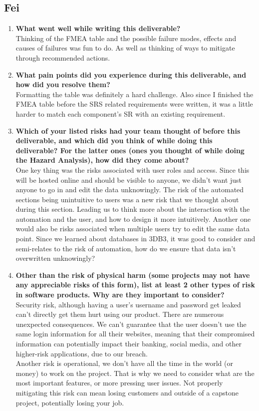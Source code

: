 \documentclass{article}
\begin{document}
\subsection*{Fei}
\begin{enumerate}
    \item \textbf{What went well while writing this deliverable?}\\
    Thinking of the FMEA table and the possible failure modes, effects and causes of failures was fun to do. As well as thinking of ways to mitigate through recommended actions.
    \item \textbf{What pain points did you experience during this deliverable, and how
    did you resolve them?}\\
    Formatting the table was definitely a hard challenge. Also since I finished the FMEA table before the SRS related requirements were written, it was a little harder to match each component's SR with an existing requirement.
    \item \textbf{Which of your listed risks had your team thought of before this
    deliverable, and which did you think of while doing this deliverable? For
    the latter ones (ones you thought of while doing the Hazard Analysis), how
    did they come about?}\\
    One key thing was the risks associated with user roles and access. Since this will be hosted online and should be visible to anyone, we didn't want just anyone to go in and edit the data unknowingly. The risk of the automated sections being unintuitive to users was a new risk
    that we thought about during this section. Leading us to think more about the interaction with the automation and the user, and how to design it more intuitively. Another one would also be risks associated when multiple users try to edit the same data point.
    Since we learned about databases in 3DB3, it was good to consider and semi-relates to the risk of automation, how do we ensure that data isn't overwritten unknowingly?
    \item \textbf{Other than the risk of physical harm (some projects may not have any
    appreciable risks of this form), list at least 2 other types of risk in
    software products. Why are they important to consider?} \\
    Security risk, although having a user's username and password get leaked can't directly get them hurt using our product. There are numerous unexpected consequences. We can't guarantee that the user doesn't use the same login information for all their websites, meaning that their compromised information can potentially impact their banking, social media, and other higher-risk applications, due to our breach.\\
    Another risk is operational, we don't have all the time in the world (or money) to work on the project. That is why we need to consider what are the most important features, or more pressing user issues. Not properly mitigating this risk can mean losing customers and outside of a capstone project, potentially losing your job.
  \end{enumerate}
\end{document}
